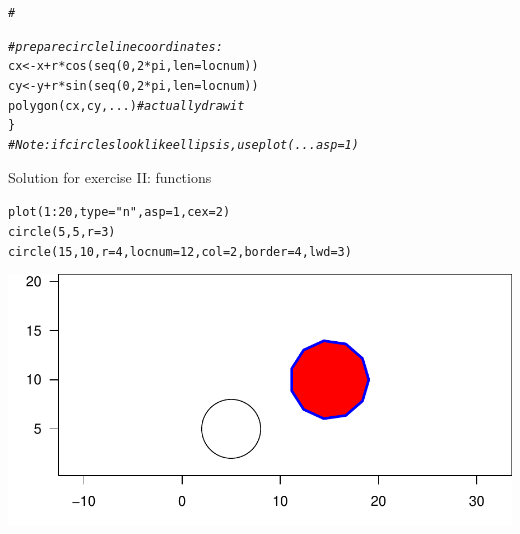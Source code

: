 \documentclass[xcolor=table,      handout ,    xcolor=dvipsnames]{beamer}\usepackage[]{graphicx}\usepackage[]{color}
\makeatletter
\newcommand{\hlnum}[1]{\textcolor[rgb]{0,0,0}{#1}}
\newcommand{\hlstr}[1]{\textcolor[rgb]{0.545,0.137,0.137}{#1}}
\newcommand{\hlcom}[1]{\textcolor[rgb]{0,0.392,0}{\textit{#1}}}
\newcommand{\hlopt}[1]{\textcolor[rgb]{0,0,0}{#1}}
\newcommand{\hlstd}[1]{\textcolor[rgb]{0,0,0}{#1}}
\newcommand{\hlkwc}[1]{\textcolor[rgb]{1,0,1}{#1}}
\newcommand{\hlkwd}[1]{\textcolor[rgb]{0,0,1}{#1}}
\newenvironment{kframe}{%
 \def\at@end@of@kframe{}%
 \ifinner\ifhmode%
  \def\at@end@of@kframe{\end{minipage}}%
  \begin{minipage}{\columnwidth}%
 \fi\fi%
 \def\FrameCommand##1{\hskip\@totalleftmargin \hskip-\fboxsep
 \colorbox{shadecolor}{##1}\hskip-\fboxsep
     \hskip-\linewidth \hskip-\@totalleftmargin \hskip\columnwidth}%
 \MakeFramed {\advance\hsize-\width
   \@totalleftmargin\z@ \linewidth\hsize
   \@setminipage}}%
 {\par\unskip\endMakeFramed%
 \at@end@of@kframe}
\newenvironment{knitrout}{}{} %
\newcounter{exercisecount}
\makeatother
\begin{document}
\begin{frame}[fragile]
\begin{knitrout}
\begin{kframe}
\begin{alltt}
 \hlcom{#}
\end{alltt}
\end{kframe}
\end{knitrout}
\pause \vspace{-2.5em}
\begin{knitrout}\scriptsize
{}\color{fgcolor}\begin{kframe}
\begin{alltt}
\hlcom{ # prepare circle line coordinates:}
 cx <- x+r*\hlkwd{cos}( \hlkwd{seq}(0,2*pi,len=locnum) )
 cy <- y+r*\hlkwd{sin}( \hlkwd{seq}(0,2*pi,len=locnum) )
 \hlkwd{polygon}(cx, cy, ...) \hlcom{# actually draw it}
 \}
\hlcom{# Note: if circles look like ellipsis, use plot(... asp=1)}
\end{alltt}
\end{kframe}
\end{knitrout}


\end{frame}


\begin{frame}[fragile]{Solution for exercise  II: functions}
\begin{knitrout}
\color{fgcolor}\begin{kframe}
\begin{alltt}
\hlkwd{plot}\hlstd{(}\hlnum{1}\hlopt{:}\hlnum{20}\hlstd{,} \hlkwc{type}\hlstd{=}\hlstr{"n"}\hlstd{,} \hlkwc{asp}\hlstd{=}\hlnum{1}\hlstd{,} \hlkwc{cex}\hlstd{=}\hlnum{2}\hlstd{)}
\hlkwd{circle}\hlstd{(}\hlnum{5}\hlstd{,}\hlnum{5}\hlstd{,} \hlkwc{r}\hlstd{=}\hlnum{3}\hlstd{)}
\hlkwd{circle}\hlstd{(}\hlnum{15}\hlstd{,}\hlnum{10}\hlstd{,} \hlkwc{r}\hlstd{=}\hlnum{4}\hlstd{,} \hlkwc{locnum}\hlstd{=}\hlnum{12}\hlstd{,} \hlkwc{col}\hlstd{=}\hlnum{2}\hlstd{,} \hlkwc{border}\hlstd{=}\hlnum{4}\hlstd{,} \hlkwc{lwd}\hlstd{=}\hlnum{3}\hlstd{)}
\end{alltt}
\end{kframe}

{\centering \includegraphics[width=\textwidth]{./fig/exfunsolb-1} 

}



\end{knitrout}
\end{frame}
\end{document}
